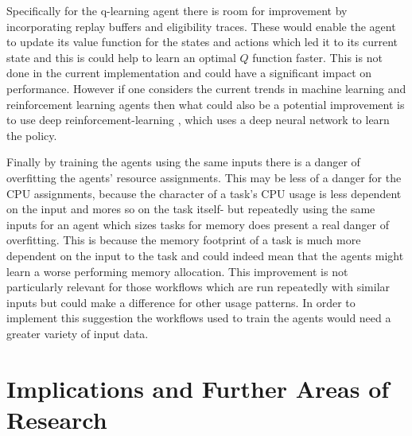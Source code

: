 Specifically for the q-learning agent there is room for improvement by incorporating replay buffers and eligibility traces. These would enable the agent to update its value function for the states and actions which led it to its current state and this is could help to learn an optimal $Q$ function faster. This is not done in the current implementation and could have a significant impact on performance. However if one considers the current trends in machine learning and reinforcement learning agents then what could also be a potential improvement is to use deep reinforcement-learning \cite{deepQ}, which uses a deep neural network to learn the policy. 

Finally by training the agents using the same inputs there is a danger of overfitting the agents’ resource assignments. This may be less of a danger for the CPU assignments, because the character of a task’s CPU usage is less dependent on the input and mores so on the task itself- but repeatedly using the same inputs for an agent which sizes tasks for memory does present a real danger of overfitting. This is because the memory footprint of a task is much more dependent on the input to the task and could indeed mean that the agents might learn a worse performing memory allocation. This improvement is not particularly relevant for those workflows which are run repeatedly with similar inputs but could make a difference for other usage patterns. In order to implement this suggestion the workflows used to train the agents would need a greater variety of input data.

\section{Implications and Further Areas of Research}
\label{sec:implications}

